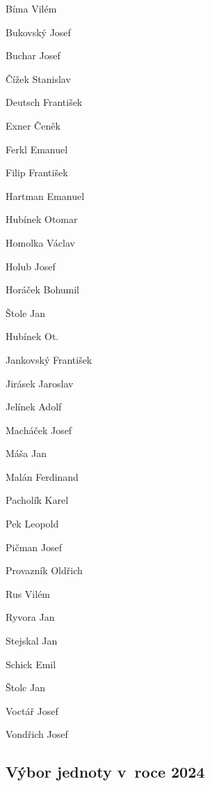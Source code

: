 \documentclass[a5paper, 11pt, twoside]{article}
\begin{document}
\begin{multicols}{2}
\setlength{\parskip}{3pt}
Bíma Vilém

Bukovský Josef

Buchar Josef

Čížek Stanislav

Deutsch František

Exner Čeněk

Ferkl Emanuel

Filip František

Hartman Emanuel

Hubínek Otomar

Homolka Václav

Holub Josef

Horáček Bohumil

Štole Jan

Hubínek Ot.

Jankovský František

Jirásek Jaroslav

Jelínek Adolf

Macháček Josef

Máša Jan

Malán Ferdinand

Pacholík Karel

Pek Leopold

Pičman Josef

Provazník Oldřich

Rus Vilém

Ryvora Jan

Stejskal Jan

Schick Emil

Štolc Jan

Voctář Josef

Vondřich Josef

\end{multicols}

\clearpage

\subsection*{Výbor jednoty v~roce 2024}
\end{document}
